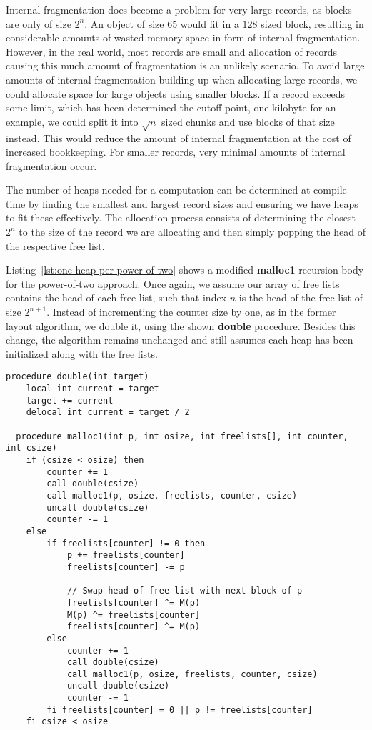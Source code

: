 Internal fragmentation does become a problem for very large records, as blocks are only of size $2^n$. An object of size $65$ would fit in a $128$ sized block, resulting in considerable amounts of wasted memory space in form of internal fragmentation. However, in the real world, most records are small and allocation of records causing this much amount of fragmentation is an unlikely scenario. To avoid large amounts of internal fragmentation building up when allocating large records, we could allocate space for large objects using smaller blocks. If a record exceeds some limit, which has been determined the cutoff point, one kilobyte for an example, we could split it into $\sqrt{n}$ sized chunks and use blocks of that size instead. This would reduce the amount of internal fragmentation at the cost of increased bookkeeping.
For smaller records, very minimal amounts of internal fragmentation occur. 

The number of heaps needed for a computation can be determined at compile time by finding the smallest and largest record sizes and ensuring we have heaps to fit these effectively. The allocation process consists of determining the closest $2^n$ to the size of the record we are allocating and then simply popping the head of the respective free list.

Listing~\ref{lst:one-heap-per-power-of-two} shows a modified \textbf{malloc1} recursion body for the power-of-two approach. Once again, we assume our array of free lists contains the head of each free list, such that index $n$ is the head of the free list of size $2^{n+1}$. Instead of incrementing the counter size by one, as in the former layout algorithm, we double it, using the shown \textbf{double} procedure. Besides this change, the algorithm remains unchanged and still assumes each heap has been initialized along with the free lists.\\

\begin{lstlisting}[caption={Allocation algorithm for one heap per power-of-two implemented in extended Janus}, language=janus, style=basic, label={lst:one-heap-per-power-of-two}]
  procedure double(int target)
    local int current = target
    target += current
    delocal int current = target / 2

  procedure malloc1(int p, int osize, int freelists[], int counter, int csize)
    if (csize < osize) then
        counter += 1
        call double(csize)
        call malloc1(p, osize, freelists, counter, csize) 
        uncall double(csize)
        counter -= 1
    else
        if freelists[counter] != 0 then
            p += freelists[counter]
            freelists[counter] -= p

            // Swap head of free list with next block of p
            freelists[counter] ^= M(p)
            M(p) ^= freelists[counter]
            freelists[counter] ^= M(p)
        else
            counter += 1
            call double(csize)
            call malloc1(p, osize, freelists, counter, csize)
            uncall double(csize)
            counter -= 1
        fi freelists[counter] = 0 || p != freelists[counter]
    fi csize < osize   
\end{lstlisting}


